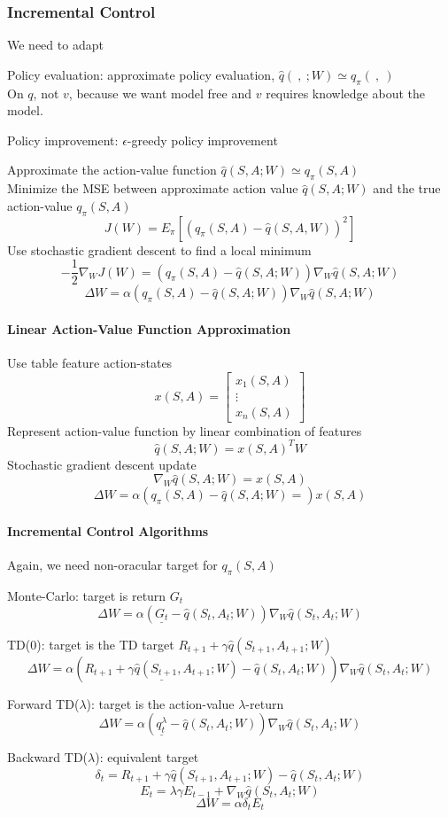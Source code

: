 \documentclass[10pt]{report}
\begin{document}
\subsubsection{Incremental Control}
We need to adapt
\begin{list}{}{}
	\item Policy evaluation: approximate policy evaluation, $\hat{q}(\:,\:;W)\simeq q_\pi(\:,\:)$\\
	On $q$, not $v$, because we want model free and $v$ requires knowledge about the model.
	\item Policy improvement: $\epsilon$-greedy policy improvement
\end{list}
Approximate the action-value function $\hat{q}(S,A;W)\simeq q_\pi(S,A)$\\
Minimize the MSE between approximate action value $\hat{q}(S,A;W)$ and the true action-value $q_\pi(S,A)$
$$J(W) = E_\pi[(q_\pi(S,A)-\hat{q}(S,A,W))^2]$$
Use stochastic gradient descent to find a local minimum
$$-\frac{1}{2}\nabla_W J(W) = (q_\pi(S,A) - \hat{q}(S,A;W))\nabla_W\hat{q}(S,A;W)$$
$$\Delta W=\alpha(q_\pi(S,A) - \hat{q}(S,A;W))\nabla_W\hat{q}(S,A;W)$$
\paragraph{Linear Action-Value Function Approximation} Use table feature action-states 
$$x(S,A) = \left[\begin{array}{c}
x_1(S,A)\\\vdots\\x_n(S,A)
\end{array}\right]$$
Represent action-value function by linear combination of features
$$\hat{q}(S,A;W) = x(S,A)^TW$$
Stochastic gradient descent update
$$\nabla_W\hat{q}(S,A;W) = x(S,A)$$
$$\Delta W= \alpha(q_\pi(S,A)-\hat{q}(S,A;W)=)x(S,A)$$
\paragraph{Incremental Control Algorithms} Again, we need non-oracular target for $q_\pi(S,A)$
\begin{list}{}{}
	\item Monte-Carlo: target is return $G_t$
	$$\Delta W=\alpha(\underline{G_t} - \hat{q}(S_t,A_t;W))\nabla_W\hat{q}(S_t,A_t;W)$$
	\item TD(0): target is the TD target $R_{t+1}+\gamma\hat{q}(S_{t+1},A_{t+1};W)$
	$$\Delta W=\alpha(\underline{R_{t+1}+\gamma\hat{q}(S_{t+1},A_{t+1};W)} - \hat{q}(S_t,A_t;W))\nabla_W\hat{q}(S_t,A_t;W)$$
	\item Forward TD($\lambda$): target is the action-value $\lambda$-return
	$$\Delta W=\alpha(\underline{q_t^\lambda} - \hat{q}(S_t,A_t;W))\nabla_W\hat{q}(S_t,A_t;W)$$
	\item Backward TD($\lambda$): equivalent target
	$$\delta_t = R_{t+1} + \gamma\hat{q}(S_{t+1},A_{t+1};W)-\hat{q}(S_t,A_t;W)$$
	$$E_t=\lambda\gamma E_{t-1} + \nabla_W\hat{q}(S_t,A_t;W)$$
	$$\Delta W = \alpha\delta_t E_t$$
\end{list}
\end{document}
